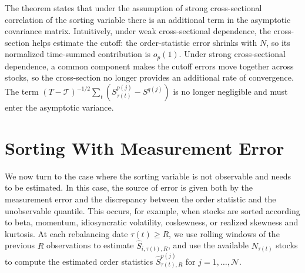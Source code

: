 \noindent
The theorem states that under the assumption of strong cross-sectional correlation of the sorting variable there is an additional term in the asymptotic covariance matrix. %
Intuitively, under weak cross-sectional dependence, the cross-section helps estimate the cutoff: the order-statistic error shrinks with \(N\), so its normalized time-summed contribution is \(o_p(1)\). Under strong cross-sectional dependence, a common component makes the cutoff errors move together across stocks, so the cross-section no longer provides an additional rate of convergence. The term \((T-\mathcal T)^{-1/2}\sum_t (S_{\tau(t)}^{p(j)}-S^{q(j)})\) is no longer negligible and must enter the asymptotic variance.





\section{Sorting With Measurement Error}
\label{Sorting With Measurement Error}

We now turn to the case where the sorting variable is not observable and needs to be estimated. In this case, the source of error is given both by the measurement error and the discrepancy between the order statistic and the unobservable quantile. This occurs, for example, when stocks are sorted according to beta, momentum, idiosyncratic volatility, coskewness, or realized skewness and kurtosis. At each rebalancing date $\tau(t) \geq R$, we use rolling windows of the previous $R$ observations to estimate $\widehat{S}_{i,\tau(t),R}$, and use the available $N_{\tau(t)}$ stocks to compute the estimated order statistics $\widehat{S}_{\tau(t),R}^{p(j)}$ for $j=1,\ldots, \mathcal{N}$.

